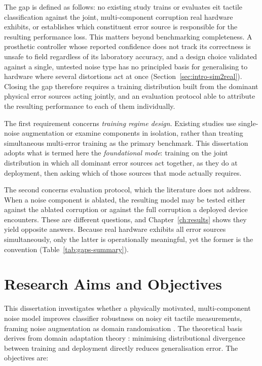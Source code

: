 The gap is defined as follows: no existing study trains or evaluates \gls{eit} tactile classification against the joint, multi-component corruption real hardware exhibits, or establishes which constituent error source is responsible for the resulting performance loss. This matters beyond benchmarking completeness. A prosthetic controller whose reported confidence does not track its correctness is unsafe to field regardless of its laboratory accuracy, and a design choice validated against a single, untested noise type has no principled basis for generalising to hardware where several distortions act at once (Section~\ref{sec:intro-sim2real}). Closing the gap therefore requires a training distribution built from the dominant physical error sources acting jointly, and an evaluation protocol able to attribute the resulting performance to each of them individually.

The first requirement concerns \emph{training regime design}. Existing studies use single-noise augmentation or examine components in isolation, rather than treating simultaneous multi-error training as the primary benchmark. This dissertation adopts what is termed here the \emph{foundational mode}: training on the joint distribution in which all dominant error sources act together, as they do at deployment, then asking which of those sources that mode actually requires.

The second concerns evaluation protocol, which the literature does not address. When a noise component is ablated, the resulting model may be tested either against the ablated corruption or against the full corruption a deployed device encounters. These are different questions, and Chapter~\ref{ch:results} shows they yield opposite answers. Because real hardware exhibits all error sources simultaneously, only the latter is operationally meaningful, yet the former is the convention (Table~\ref{tab:gaps-summary}).


\section{Research Aims and Objectives}
\label{sec:intro-aims}

This dissertation investigates whether a physically motivated, multi-component noise model improves classifier robustness on noisy \gls{eit} tactile measurements, framing noise augmentation as domain randomisation \parencite{tobin2017}. The theoretical basis derives from domain adaptation theory \parencite{ben-david2010domain, pan2010survey}: minimising distributional divergence between training and deployment directly reduces generalisation error. The objectives are:

